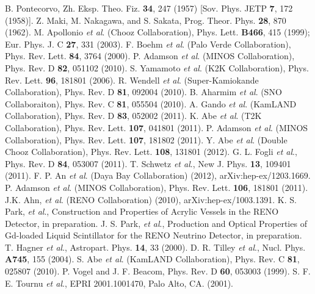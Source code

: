 \documentclass[aps,prl,twocolumn,superscriptaddress,showpacs]{revtex4-1}
\begin{document}
\begin{thebibliography}{}




 B. Pontecorvo,  Zh. Eksp. Theo. Fiz. {\bf 34}, 247 (1957) [Sov. Phys. JETP {\bf 7}, 172 (1958)].
 Z. Maki, M. Nakagawa, and S. Sakata, Prog. Theor. Phys. {\bf 28}, 870 (1962).
 M. Apollonio {\it et al}. (Chooz Collaboration), Phys. Lett. {\bf B466}, 415 (1999); Eur. Phys. J. C {\bf 27}, 331 (2003).
 F. Boehm {\it et al}. (Palo Verde Collaboration), Phys. Rev. Lett. {\bf 84}, 3764 (2000).
 P. Adamson {\it et al}. (MINOS Collaboration), Phys. Rev. D {\bf 82}, 051102 (2010).
 S. Yamamoto {\it et al}. (K2K Collaboration), Phys. Rev. Lett. {\bf 96}, 181801 (2006).
 R. Wendell {\it et al}. (Super-Kamiokande Collaboration), Phys. Rev. D {\bf 81}, 092004 (2010).
 B. Aharmim {\it et al}. (SNO Collaboraiton), Phys. Rev. C {\bf 81}, 055504 (2010).
 A. Gando {\it et al}. (KamLAND Collaboration), Phys. Rev. D {\bf 83}, 052002 (2011).
 K. Abe {\it et al}. (T2K Collaboration), Phys. Rev. Lett. {\bf 107}, 041801 (2011).
 P. Adamson {\it et al}. (MINOS Collaboration), Phys. Rev. Lett. {\bf 107}, 181802 (2011).
 Y. Abe {\it et al}. (Double Chooz Collaboration), Phys. Rev. Lett. {\bf 108}, 131801 (2012).
 G. L. Fogli {\it et al}., Phys. Rev. D {\bf 84}, 053007 (2011).
 T. Schwetz {\it et al}., New J. Phys. {\bf 13}, 109401 (2011).
 F. P. An {\it et al}. (Daya Bay Collaboration) (2012), arXiv:hep-ex/1203.1669.
 P. Adamson {\it et al}. (MINOS Collaboration), Phys. Rev. Lett. {\bf 106}, 181801 (2011).
 J.K. Ahn, {\it et al}. (RENO Collaboration) (2010), arXiv:hep-ex/1003.1391.
 K. S. Park, {\it et al}., Construction and Properties of Acrylic Vessels in the RENO Detector, in preparation.
 J. S. Park, {\it et al}., Production and Optical Properties of Gd-loaded Liquid Scintillator for the RENO Neutrino Detector, in preparation.
 T. Hagner {\it et al}., Astropart. Phys. {\bf 14}, 33 (2000).
 D. R. Tilley {\it et al}., Nucl. Phys. {\bf A745}, 155 (2004).
 S. Abe {\it et al}. (KamLAND Collaboration), Phys. Rev. C {\bf 81}, 025807 (2010).
 P. Vogel and J. F. Beacom, Phys. Rev. D {\bf 60}, 053003 (1999).
 S. F. E. Tournu {\it et al}., EPRI 2001.1001470, Palo Alto, CA. (2001).

\end{thebibliography}
\end{document}
